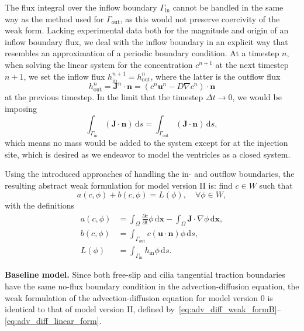 \documentclass[fleqn]{wlscirep}
\newcommand{\pdifft}[1]{\frac{\partial  #1}{\partial t}}
\newcommand{\intO}[1]{\int_{\Omega}#1 \, \mathrm d\bm{x}}
\newcommand{\intGin}[1]{\int_{\Gamma_{\mathrm{in}}}#1 \, \mathrm ds}
\newcommand{\intGout}[1]{\int_{\Gamma_{\mathrm{out}}}#1 \, \mathrm ds}
\newcommand{\Gin}{\Gamma_{\mathrm{in}}}
\newcommand{\Gout}{\Gamma_{\mathrm{out}}}
\newcommand{\nn}{\mathbf{n}}
\newcommand{\uu}{\mathbf{u}}
\newcommand{\JJ}{\mathbf{J}}
\begin{document}
The flux integral over the inflow boundary $\Gin$ cannot be handled
in the same way as the method used for $\Gout$, as this would not preserve
coercivity of the weak form. Lacking experimental data both for the magnitude and
origin of an inflow boundary flux, we deal with the inflow boundary in an explicit
way that resembles an approximation of a periodic boundary condition. At a timestep $n$,
when solving the linear system for the concentration $c^{n+1}$ at the next timestep $n+1$,
we set the inflow flux $h_{\mathrm{in}}^{n+1} = h_{\mathrm{out}}^{n}$, where the latter is the outflow flux
\begin{equation*}
    h_{\mathrm{out}}^{n} = \JJ^n\cdot\nn = (c^n\uu^n - D\nabla c^n)\cdot\nn
\end{equation*}
at the previous timestep. In the limit that the timestep $\Delta t\to 0$, we would be imposing
\begin{equation*}
    \intGin{(\JJ\cdot\nn)} = \intGout{(\JJ\cdot\nn)},
\end{equation*}
which means no mass would be added to the system except for at the injection site,
which is desired as we endeavor to model the ventricles as a closed system.

Using the introduced approaches of handling the in- and outflow boundaries,
the resulting abstract weak formulation for model version II is: find $c\in W$ such that
\begin{equation}
    a(c, \phi) + b(c, \phi) = L(\phi), \quad\forall\phi\in W, \label{eq:adv_diff_weak_formB}
\end{equation}
with the definitions
\begin{align}
    a(c, \phi) &= \intO{\pdifft{c}\phi} - \intO{\JJ\cdot\nabla\phi}, \label{eq:adv_diff_bilinear_form}\\
    b(c, \phi) &= \intGout{c(\uu\cdot\nn)\phi}, \label{eq:adv_diff_skew_form} \\
    L(\phi) &= \intGin{h_{\mathrm{in}}\phi}.\label{eq:adv_diff_linear_form}
\end{align}

\textbf{Baseline model.} Since both free-slip and cilia tangential traction boundaries have the same no-flux boundary condition in the advection-diffusion equation, the weak formulation of the advection-diffusion equation for model version 0 is identical to that of model version II, defined by~\eqref{eq:adv_diff_weak_formB}--\eqref{eq:adv_diff_linear_form}.
\end{document}
